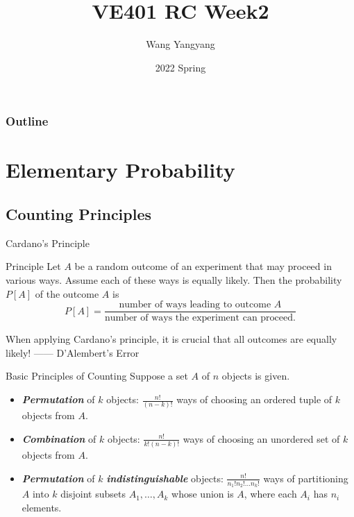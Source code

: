 \documentclass{beamer}
\title{VE401 RC Week2}
\author{Wang Yangyang}
\date{2022 Spring}
\institute{UM-SJTU JI}
\newcommand{\bb}[1]{\textcolor{antiquefuchsia}{\textbf{\textit{#1}}}}
\begin{document}
\maketitle

\begin{frame}
\frametitle{Outline}
\tableofcontents
\end{frame}



\section{Elementary Probability}
\subsection{Counting Principles}
\begin{frame}{Cardano’s Principle}
\begin{block}{Principle}
Let $A$ be a random outcome of an experiment
that may proceed in various ways. Assume each of these ways is equally
likely. Then the probability $P[A]$ of the outcome $A$ is $$P[A]=\frac{\text{number of ways leading to outcome } A}{\text{number of ways the experiment can proceed}.}$$
\end{block}
When applying Cardano’s principle, it is crucial that all outcomes are
equally likely! —— D’Alembert’s Error
\end{frame}


\begin{frame}{Basic Principles of Counting}
Suppose a set $A$ of $n$ objects is given.
\begin{itemize}
\item \bb{Permutation} of $k$ objects: $\frac{n !}{(n-k) !}$ ways of choosing an ordered tuple of $k$ objects from $A$.
\item \bb{Combination} of $k$ objects: $\frac{n !}{k !(n-k) !}$ ways of choosing an unordered set of $k$ objects from $A$.
\item \bb{Permutation} of $k$ \bb{indistinguishable} objects: $\frac{n !}{n_{1} ! n_{2} ! \ldots n_{k} !}$ ways of partitioning $A$ into $k$ disjoint subsets $A_{1}, \ldots, A_{k}$ whose union is $A$, where each $A_{i}$ has $n_{i}$ elements.
\end{itemize}
\end{frame}
\end{document}

